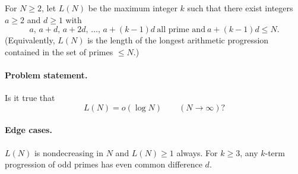 For $N\ge 2$, let $L(N)$ be the maximum integer $k$ such that there exist integers $a\ge 2$ and $d\ge 1$ with
\[
a,\, a+d,\, a+2d,\,\dots,\, a+(k-1)d \ \text{all prime and}\ a+(k-1)d\le N.
\]
(Equivalently, $L(N)$ is the length of the longest arithmetic progression contained in the set of primes $\le N$.)

\paragraph{Problem statement.}
Is it true that
\[
L(N)=o(\log N)\qquad (N\to\infty)?
\]

\paragraph{Edge cases.}
$L(N)$ is nondecreasing in $N$ and $L(N)\ge 1$ always.
For $k\ge 3$, any $k$-term progression of odd primes has even common difference $d$.
